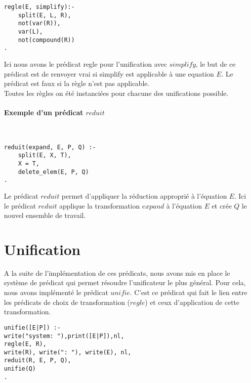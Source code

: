 \documentclass[10pt,a4paper]{report}
\begin{document}
\begin{lstlisting}[caption ={Choix de la règle $simplify$}]
regle(E, simplify):-
	split(E, L, R),
	not(var(R)),
	var(L),
	not(compound(R))
.
\end{lstlisting}
Ici nous avons le prédicat regle pour l'unification avec $simplify$, le but de ce prédicat est de renvoyer vrai si simplify est applicable à une equation $E$. Le prédicat est faux si la règle n'est pas applicable. \\
Toutes les règles on été instanciées pour chacune des unifications possible.

\paragraph{Exemple d'un prédicat $reduit$} ~\\

\begin{lstlisting}[caption ={Application de la réduction $expand$}]
reduit(expand, E, P, Q) :-
	split(E, X, T),
	X = T,
	delete_elem(E, P, Q)
.
\end{lstlisting}
Le prédicat $reduit$ permet d'appliquer la réduction approprié à l'équation $E$. Ici le prédicat $reduit$ applique la transformation $expand$ à l'équation $E$ et crée $Q$ le nouvel ensemble de travail. 

\section*{Unification}
A la suite de l'implémentation de ces prédicats, nous avons mis en place le système de prédicat qui permet résoudre l'unificateur le plus général. Pour cela, nous avons implémenté le prédicat $unifie$. C'est ce prédicat qui fait le lien entre les prédicats de choix de transformation ($regle$) et ceux d'application de cette transformation.

\begin{lstlisting}[caption ={Prédicat d'unification d'un système d'équation}]
unifie([E|P]) :-
write("system: "),print([E|P]),nl,
regle(E, R),
write(R), write(": "), write(E), nl,
reduit(R, E, P, Q),
unifie(Q)
.
\end{lstlisting}
\end{document}
